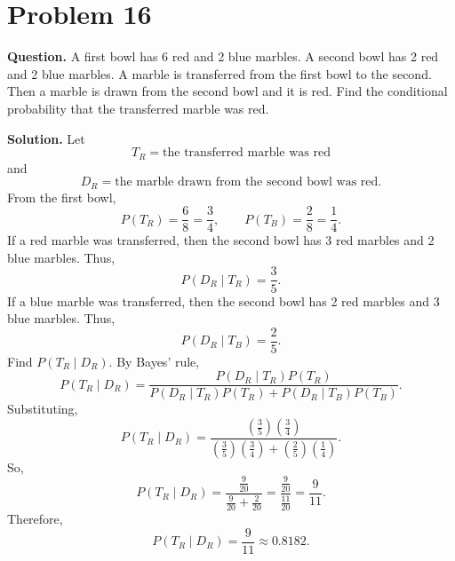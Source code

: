 \documentclass[11pt]{article}
\begin{document}
\section*{Problem 16}

\textbf{Question.} A first bowl has 6 red and 2 blue marbles. A second bowl has 2 red and 2 blue marbles. A marble is transferred from the first bowl to the second. Then a marble is drawn from the second bowl and it is red. Find the conditional probability that the transferred marble was red.

\textbf{Solution.} Let
\[
T_R=\text{the transferred marble was red}
\]
and
\[
D_R=\text{the marble drawn from the second bowl was red}.
\]
From the first bowl,
\[
P(T_R)=\frac{6}{8}=\frac{3}{4}, \qquad P(T_B)=\frac{2}{8}=\frac{1}{4}.
\]
If a red marble was transferred, then the second bowl has 3 red marbles and 2 blue marbles. Thus,
\[
P(D_R\mid T_R)=\frac{3}{5}.
\]
If a blue marble was transferred, then the second bowl has 2 red marbles and 3 blue marbles. Thus,
\[
P(D_R\mid T_B)=\frac{2}{5}.
\]
Find $P(T_R\mid D_R)$. By Bayes' rule,
\[
P(T_R\mid D_R)=\frac{P(D_R\mid T_R)P(T_R)}{P(D_R\mid T_R)P(T_R)+P(D_R\mid T_B)P(T_B)}.
\]
Substituting,
\[
P(T_R\mid D_R)=\frac{\left(\frac{3}{5}\right)\left(\frac{3}{4}\right)}{\left(\frac{3}{5}\right)\left(\frac{3}{4}\right)+\left(\frac{2}{5}\right)\left(\frac{1}{4}\right)}.
\]
So,
\[
P(T_R\mid D_R)=\frac{\frac{9}{20}}{\frac{9}{20}+\frac{2}{20}}=\frac{\frac{9}{20}}{\frac{11}{20}}=\frac{9}{11}.
\]
Therefore,
\[
\boxed{P(T_R\mid D_R)=\frac{9}{11}\approx 0.8182}.
\]

\newpage
\end{document}
